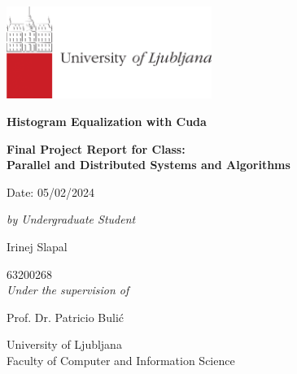 \documentclass[10pt]{article}
\begin{document}

\begin{center}
\vspace*{-1cm} %


\includegraphics[width=0.5\textwidth]{images/University-of-Ljubljana.png}\\
\vspace*{2cm}

{\huge \textbf{Histogram Equalization with Cuda}}

\vspace*{3\baselineskip}

{\LARGE \textbf{Final Project Report for Class: \\ Parallel and Distributed Systems and Algorithms }}

\begin{large}
\vspace*{2\baselineskip}

Date: 05/02/2024

\vspace*{4\baselineskip}

\emph{by Undergraduate Student} \\[1ex]
{\Large Irinej Slapal \\ \par} %
{{ 63200268}}\\[2cm] %


\emph {Under the supervision of} \\ %
[\baselineskip] %
{\Large Prof. Dr. Patricio Bulić\\ \par}

\vspace*{4.5cm}

{University of Ljubljana}\\
{\large Faculty of Computer and Information Science}\par %

\thispagestyle{empty} 

\end{large}
\end{center}
\pagebreak
\end{document}
